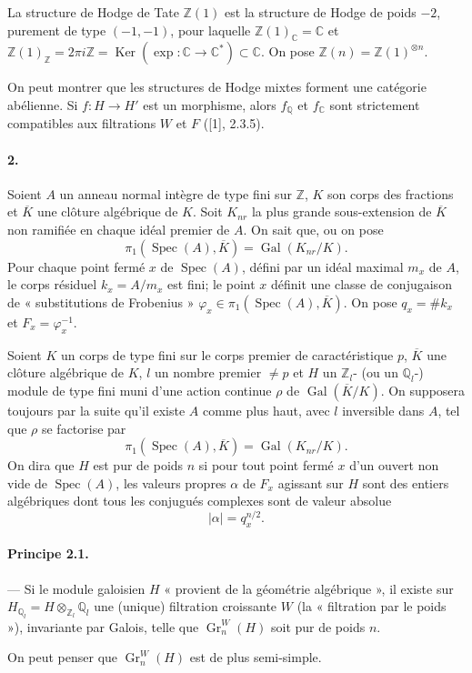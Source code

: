 \documentclass[10pt]{article}
\newcommand{\C}{\mathbb C}
\newcommand{\Q}{\mathbb Q}
\newcommand{\Z}{\mathbb Z}
\newcommand{\Gr}{\operatorname{Gr}}
\newcommand{\Gal}{\operatorname{Gal}}
\newcommand{\Spec}{\operatorname{Spec}}
\newcommand{\Ker}{\operatorname{Ker}}
\newcommand{\barK}{\overline{K}}
\begin{document}
La structure de Hodge de Tate $\Z(1)$ est la structure de Hodge de poids $-2$, purement de type $(-1,-1)$, pour laquelle $\Z(1)_\C=\C$ et $\Z(1)_\Z=2\pi i\Z=\Ker(\exp:\C\to\C^*)\subset\C$. On pose $\Z(n)=\Z(1)^{\otimes n}$.

On peut montrer que les structures de Hodge mixtes forment une catégorie abélienne. Si $f:H\to H'$ est un morphisme, alors $f_\Q$ et $f_\C$ sont strictement compatibles aux filtrations $W$ et $F$ ([1], 2.3.5).

\paragraph{2.} Soient $A$ un anneau normal intègre de type fini sur $\Z$, $K$ son corps des fractions et $\barK$ une clôture algébrique de $K$. Soit $K_{nr}$ la plus grande sous-extension de $\barK$ non ramifiée en chaque idéal premier de $A$. On sait que, ou on pose
\[
\pi_1(\Spec(A),\barK)=\Gal(K_{nr}/K).
\]
Pour chaque point fermé $x$ de $\Spec(A)$, défini par un idéal maximal $m_x$ de $A$, le corps résiduel $k_x=A/m_x$ est fini; le point $x$ définit une classe de conjugaison de « substitutions de Frobenius » $\varphi_x\in\pi_1(\Spec(A),\barK)$. On pose $q_x=\#k_x$ et $F_x=\varphi_x^{-1}$.

Soient $K$ un corps de type fini sur le corps premier de caractéristique $p$, $\barK$ une clôture algébrique de $K$, $l$ un nombre premier $\ne p$ et $H$ un $\Z_l$- (ou un $\Q_l$-) module de type fini muni d'une action continue $\rho$ de $\Gal(\barK/K)$. On supposera toujours par la suite qu'il existe $A$ comme plus haut, avec $l$ inversible dans $A$, tel que $\rho$ se factorise par
\[
\pi_1(\Spec(A),\barK)=\Gal(K_{nr}/K).
\]
On dira que $H$ est pur de poids $n$ si pour tout point fermé $x$ d'un ouvert non vide de $\Spec(A)$, les valeurs propres $\alpha$ de $F_x$ agissant sur $H$ sont des entiers algébriques dont tous les conjugués complexes sont de valeur absolue
\[
|\alpha|=q_x^{n/2}.
\]

\paragraph{Principe 2.1.} — Si le module galoisien $H$ « provient de la géométrie algébrique », il existe sur $H_{\Q_l}=H\otimes_{\Z_l}\Q_l$ une (unique) filtration croissante $W$ (la « filtration par le poids »), invariante par Galois, telle que $\Gr_n^W(H)$ soit pur de poids $n$.

On peut penser que $\Gr_n^W(H)$ est de plus semi-simple.
\end{document}
